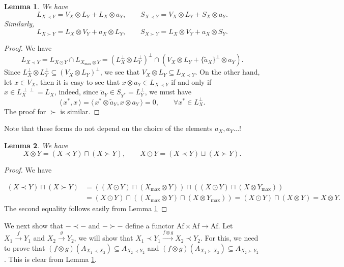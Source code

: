 \documentclass[12pt]{article}
\newtheorem{lemma}{Lemma}
\theoremstyle{definition}
\theoremstyle{remark}
\def\<{\langle\,}
\def\>{\,\rangle}
\def \Af{\mathrm{Af}}
\begin{document}
\begin{lemma}\label{lemma:prec} We have
\[
L_{X\prec Y}=V_X\otimes L_Y+L_X\otimes a_Y,\qquad S_{X\prec Y} =V_X\otimes L_Y+S_X\otimes
a_Y.
\]
Similarly,
\[
L_{X\succ Y}=L_X\otimes V_Y+a_X\otimes L_Y,\qquad S_{X\succ Y} =L_X\otimes V_Y+a_X\otimes
S_Y.
\]
\end{lemma}

\begin{proof} We have
\[
L_{X\prec Y}=L_{X\odot Y}\cap L_{X_{\max}\otimes Y}=(L_X^\perp\otimes L_Y^\perp)^\perp\cap
(V_X\otimes L_Y+\{\tilde a_X\}^\perp\otimes a_Y).
\]
Since $L_X^\perp\otimes L_Y^\perp\subseteq (V_X\otimes L_Y)^\perp$, we see that
$V_X\otimes L_Y\subseteq L_{X\prec Y}$. On the other hand, let $x\in V_X$, then it is easy
to see that $x\otimes
a_Y\in L_{X\prec Y}$ if and only if $x\in L_X^{\perp\perp}=L_X$, indeed, since $\tilde
a_Y\in S_{Y^*}=L_Y^\perp$, we must have
\[
\<x^*,x\>=\<x^*\otimes \tilde a_Y,x\otimes a_Y\>=0,\qquad \forall x^*\in L_X^\perp.
\]
The proof for $\succ$ is similar.

\end{proof}



Note that these forms do not depend on the choice of the elements $a_X,a_Y$...!

\begin{lemma}\label{lemma:decomp} We have
\[
X\otimes Y=(X\prec Y) \sqcap (X\succ Y),\qquad X\odot Y= (X\prec Y)\sqcup (X\succ Y).
\]

\end{lemma}

\begin{proof} We have 

\begin{align*}
(X\prec Y) \sqcap (X\succ Y)&=((X\odot Y)\sqcap (X_{\max}\otimes Y))\sqcap ((X\odot
Y)\sqcap (X\otimes Y_{\max}))\\
&= (X\odot Y) \sqcap((X_{\max}\otimes Y)\sqcap (X\otimes Y_{\max}))=(X\odot Y)\sqcap
(X\otimes Y)=X\otimes Y.
\end{align*}
The second equality follows easily from Lemma \ref{lemma:prec}
\end{proof}

We next show that $-\prec -$ and $-\succ -$ define a functor $\Af\times \Af\to \Af$. Let
$X_1\xrightarrow{f} Y_1$ and $X_2\xrightarrow{g} Y_2$, we will show that 
$X_1\prec Y_1\xrightarrow{f\otimes g} X_2\prec Y_2$. For this, we need to prove that 
$(f\otimes g)(A_{X_1\prec X_2})\subseteq A_{X_2\prec Y_2}$ and $(f\otimes g)(A_{X_1\succ
X_2})\subseteq A_{X_2\succ Y_2}$. This is clear from Lemma \ref{lemma:prec}. 
\end{document}
